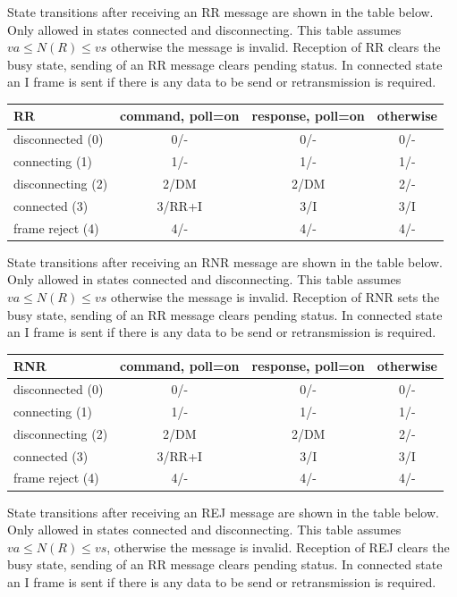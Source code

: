 \documentclass[a4paper]{article}
\begin{document}
State transitions after receiving an RR message are shown in the table below. Only allowed in states connected and disconnecting. This table assumes $va \leq N(R) \leq vs$ otherwise the message is invalid. Reception of RR clears the busy state, sending of an RR message clears pending status. In connected state an I frame is sent if there is any data to be send or retransmission is required.

{\footnotesize
\begin{center}
\begin{tabular}{|l|c|c|c|}
\hline
 RR & command, poll=on & response, poll=on & otherwise \\
\hline
 disconnected (0) & 0/- & 0/- & 0/- \\
\hline
 connecting (1) & 1/- & 1/- & 1/- \\
\hline
 disconnecting (2) & 2/DM & 2/DM & 2/- \\
\hline
 connected (3) & 3/RR+I & 3/I & 3/I  \\
\hline
 frame reject (4) & 4/- & 4/- & 4/- \\
\hline
\end{tabular}
\end{center}
}

State transitions after receiving an RNR message are shown in the table below. Only allowed in states connected and disconnecting. This table assumes $va \leq N(R) \leq vs$ otherwise the message is invalid. Reception of RNR sets the busy state, sending of an RR message clears pending status. In connected state an I frame is sent if there is any data to be send or retransmission is required.

{\footnotesize
\begin{center}
\begin{tabular}{|l|c|c|c|}
\hline
 RNR & command, poll=on & response, poll=on & otherwise \\
\hline
 disconnected (0) & 0/- & 0/- & 0/- \\
\hline
 connecting (1) & 1/- & 1/- & 1/- \\
\hline
 disconnecting (2) & 2/DM & 2/DM & 2/- \\
\hline
 connected (3) & 3/RR+I & 3/I & 3/I  \\
\hline
 frame reject (4) & 4/- & 4/- & 4/- \\
\hline
\end{tabular}
\end{center}
}

State transitions after receiving an REJ message are shown in the table below. Only allowed in states connected and disconnecting. This table assumes $va \leq N(R) \leq vs$, otherwise the message is invalid. Reception of REJ clears the busy state, sending of an RR message clears pending status. In connected state an I frame is sent if there is any data to be send or retransmission is required.
\end{document}
